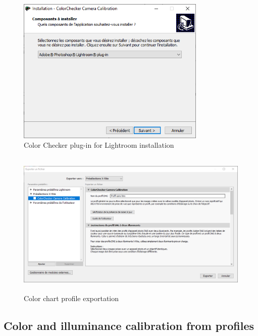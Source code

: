 \documentclass[
]{book}
\begin{document}
\begin{figure}
\hypertarget{color_checker_plug_in_win}{%
\centering
\includegraphics[width=\textwidth,height=7cm]{Figures/color_checker_plug_in_win.png}
\caption{Color Checker plug-in for Lightroom
installation}\label{color_checker_plug_in_win}
}
\end{figure}

\begin{figure}
\hypertarget{x_rite_preselection}{%
\centering
\includegraphics[width=\textwidth,height=7cm]{Figures/x_rite_preselection.png}
\caption{Color chart profile
exportation}\label{x_rite_preselection}
}
\end{figure}

\hypertarget{color-and-illuminance-calibration-from-profiles}{%
\subsection{Color and illuminance calibration from profiles}\label{color-and-illuminance-calibration-from-profiles}}
\end{document}
